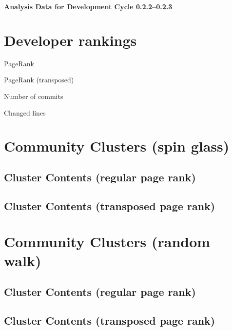 \documentclass{article}
\begin{document}
\setlength{\parindent}{0pt}
\begin{center}
\begin{Large}
\textbf{Analysis Data for Development Cycle 0.2.2--0.2.3}
\end{Large}
\end{center}
\section{Developer rankings}
\begin{small}\renewcommand{\tabcolsep}{1pt}
\begin{minipage}{0.5\linewidth}
PageRank\\

\end{minipage}%
\begin{minipage}{0.5\linewidth}
PageRank (transposed)\\

\end{minipage}

\renewcommand{\tabcolsep}{5pt}
\begin{minipage}{0.5\linewidth}
Number of commits\\

\end{minipage}%
\begin{minipage}{0.5\linewidth}
Changed lines\\

\end{minipage}
\end{small}
\newpage\section{Community Clusters (spin glass)}
\subsection{Cluster Contents (regular page rank)}
\newpage\subsection{Cluster Contents (transposed page rank)}
\newpage\section{Community Clusters (random walk)}
\subsection{Cluster Contents (regular page rank)}
\newpage\subsection{Cluster Contents (transposed page rank)}
\end{document}
